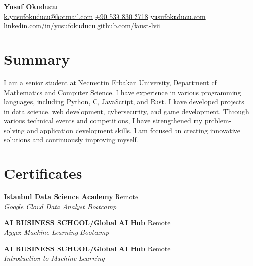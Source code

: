 \documentclass[10pt,a4paper]{extarticle}
\begin{document}
\begin{center}
    \begin{minipage}{\textwidth}
        \centering
        {\LARGE\textbf{Yusuf Okuducu}}\\[20pt]
        \href{mailto:k.yusufokuducu@hotmail.com}{k.yusufokuducu@hotmail.com} \quad
        \href{tel:+905398302718}{+90 539 830 2718} \quad
        \href{https://yusufokuducu.com}{yusufokuducu.com} \quad
        \href{https://linkedin.com/in/yusufokuducu}{linkedin.com/in/yusufokuducu} \quad
        \href{https://github.com/faust-lvii}{github.com/faust-lvii}
    \end{minipage}
\end{center}

\vspace{10pt}

\section{Summary}
I am a senior student at Necmettin Erbakan University, Department of Mathematics
and Computer Science. I have experience in various programming languages,
including Python, C, JavaScript, and Rust. I have developed projects in data science,
web development, cybersecurity, and game development. Through various technical
events and competitions, I have strengthened my problem-solving and application
development skills. I am focused on creating innovative solutions and continuously
improving myself.

\vspace{10pt}

\section{Certificates}
\textbf{Istanbul Data Science Academy} \hfill Remote\\
\textit{Google Cloud Data Analyst Bootcamp}

\vspace{5pt}

\textbf{AI BUSINESS SCHOOL/Global AI Hub} \hfill Remote\\
\textit{Aygaz Machine Learning Bootcamp}

\vspace{5pt}

\textbf{AI BUSINESS SCHOOL/Global AI Hub} \hfill Remote\\
\textit{Introduction to Machine Learning}

\vspace{10pt}
\end{document}
